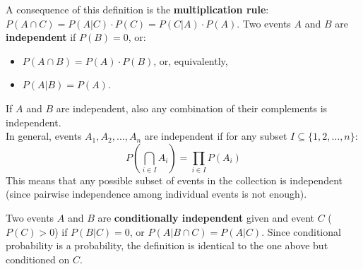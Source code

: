 A consequence of this definition is the \textbf{multiplication rule}: $P(A \cap C) = P(A|C) \cdot P(C) = P(C|A) \cdot P(A)$.
Two events $A$ and $B$ are \textbf{independent} if $P(B) = 0$, or:
\begin{itemize}[itemsep=1pt]
    \item $P(A \cap B) = P(A) \cdot P(B)$, or, equivalently,
    \item $P(A|B) = P(A)$.
\end{itemize}
If $A$ and $B$ are independent, also any combination of their complements is independent. \\
In general, events $A_1, A_2, \dots, A_n$ are independent if for any subset $I \subseteq \{1, 2, \dots, n\}$:
\begin{equation*}
    P\left(\bigcap_{i \in I} A_i\right) = \prod_{i \in I} P(A_i)
\end{equation*}
This means that any possible subset of events in the collection is independent (since pairwise independence among individual events is not enough).

Two events $A$ and $B$ are \textbf{conditionally independent} given and event $C$ ($P(C) > 0$) if $P(B|C) = 0$, or $P(A|B \cap C) = P(A|C)$. Since conditional probability is a probability, the definition is identical to the one above but conditioned on $C$.
